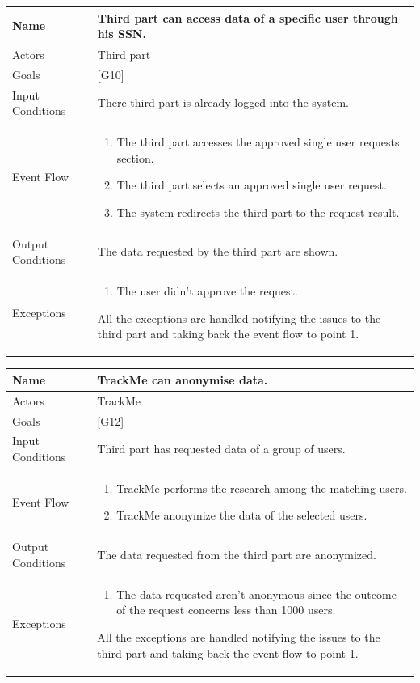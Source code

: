\documentclass{article}
\begin{document}
\begin{center}
    \begin{tabular}{ | l | p{10cm} |}
    \hline
    Name & Third part can access data of a specific user through his SSN.\\ \hline
    Actors & Third part\\ \hline
   	Goals & {[G10]}\\ \hline
    Input Conditions & There third part is already logged into the system.\\ \hline
    Event Flow & \begin{enumerate}
    	\item The third part accesses the approved single user requests section.
    	\item The third part selects an approved single user request. 
    	\item The system redirects the third part to the request result.
    \end{enumerate} \\ \hline
    Output Conditions & The data requested by the third part are shown.  \\ \hline
    Exceptions & \begin{enumerate}
   \item The user didn't approve the request.
\end{enumerate} All the exceptions are handled notifying the issues to the third part and taking back the event flow to point 1.    \\ \hline
    \end{tabular}
\end{center}

\begin{center}
    \begin{tabular}{ | l | p{10cm} |}
    \hline
    Name & TrackMe can anonymise data. \\ \hline
    Actors & TrackMe\\ \hline
   	Goals & {[G12]}\\ \hline
    Input Conditions & Third part has requested data of a group of users.\\ \hline
    Event Flow & \begin{enumerate}
		\item TrackMe performs the research among the matching users.
		\item TrackMe anonymize the data of the selected users.
    \end{enumerate} \\ \hline
    Output Conditions & The data requested from the third part are anonymized. \\ \hline
    Exceptions & \begin{enumerate}
  		\item The data requested aren’t anonymous since the outcome of the request concerns less than 1000 users.
\end{enumerate} All the exceptions are handled notifying the issues to the third part and taking back the event flow to point 1.    \\ \hline
    \end{tabular}
\end{center}
\end{document}
